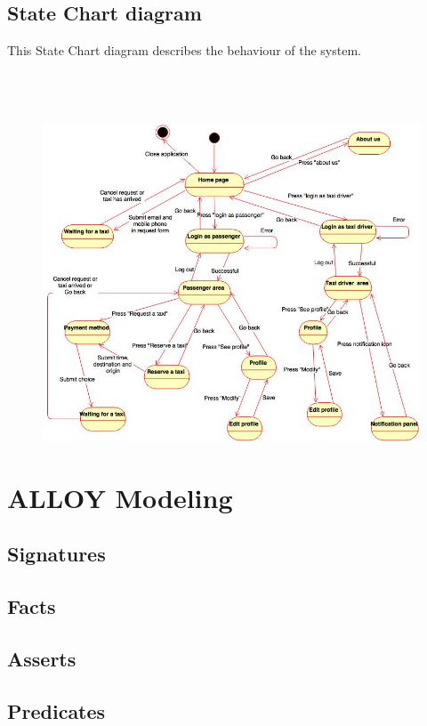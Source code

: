 \documentclass[18pt,oneside,a4paper, titlepage]{article}
\begin{document}
	\subsection{State Chart diagram}
		This State Chart diagram describes the behaviour of the system.
		\\ \\ \\ \\ 
		\begin{figure}[h]
			\centering
			\includegraphics[scale=0.5]{stateChartDiagram.jpg}
		\end{figure}

\newpage
\section{ALLOY Modeling}
	\subsection{Signatures}
	\subsection{Facts}
	\subsection{Asserts}
	\subsection{Predicates}
\end{document}
